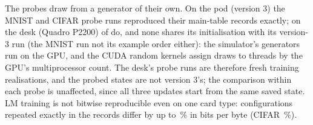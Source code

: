 The probes draw from a generator of their own. On the pod (version 3) the MNIST and CIFAR probe runs reproduced their main-table
records exactly; on the desk (Quadro P2200) \RYProbeRunsEqualEThree{} of \RYProbeRunsN{} do, and none shares its
initialisation with its version-3 run (the MNIST run not its example order either): the simulator's generators run on
the GPU, and the CUDA random kernels assign draws to threads by the GPU's multiprocessor count. The desk's probe runs
are therefore fresh training realisations, and the probed states are not version 3's; the comparison within each
probe is unaffected, since all three updates start from the same saved state. LM training is not bitwise reproducible even on one card
type: configurations repeated exactly in the records differ by up to \RXReproLmMaxPct\,\% in bits per byte (CIFAR
\RXReproCifarMaxPct\,\%).

